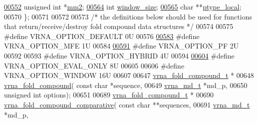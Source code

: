 \begin{DoxyCode}
\hypertarget{data__structures_8h_source_l00552}{}\hyperlink{group__fold__compound_a54c0b979274b285a7e093ed54aa3252e}{00552}   \textcolor{keywordtype}{unsigned} \textcolor{keywordtype}{int}    *\hyperlink{group__fold__compound_a54c0b979274b285a7e093ed54aa3252e}{mm2};           
\hypertarget{data__structures_8h_source_l00564}{}\hyperlink{group__fold__compound_adacbf7cdfb47d3072683ab509de735f6}{00564}   \textcolor{keywordtype}{int}             \hyperlink{group__fold__compound_adacbf7cdfb47d3072683ab509de735f6}{window\_size};    
\hypertarget{data__structures_8h_source_l00565}{}\hyperlink{group__fold__compound_a2ecb8ff5e21190936a8a146be7a251ff}{00565}   \textcolor{keywordtype}{char}            **\hyperlink{group__fold__compound_a2ecb8ff5e21190936a8a146be7a251ff}{ptype\_local};  
00570 \};
00571 
00572 
00573 \textcolor{comment}{/* the definitions below should be used for functions that return/receive/destroy fold compound data
       structures */}
00574 
00575 \textcolor{preprocessor}{#define VRNA\_OPTION\_DEFAULT         0U}
00576 
\hypertarget{data__structures_8h_source_l00583}{}\hyperlink{group__fold__compound_gae63be9127fe7dcc1f9bb14f5bb1064ee}{00583} \textcolor{preprocessor}{#define VRNA\_OPTION\_MFE             1U}
00584 
\hypertarget{data__structures_8h_source_l00591}{}\hyperlink{group__fold__compound_gabfbadcddda3e74ce7f49035ef8f058f7}{00591} \textcolor{preprocessor}{#define VRNA\_OPTION\_PF              2U}
00592 
00593 \textcolor{preprocessor}{#define VRNA\_OPTION\_HYBRID          4U}
00594 
\hypertarget{data__structures_8h_source_l00604}{}\hyperlink{group__fold__compound_ga61469c423131552c8483229f8b6c7e0e}{00604} \textcolor{preprocessor}{#define VRNA\_OPTION\_EVAL\_ONLY       8U}
00605 
00606 \textcolor{preprocessor}{#define VRNA\_OPTION\_WINDOW          16U}
00607 
00647 \hyperlink{group__fold__compound_structvrna__fc__s}{vrna\_fold\_compound\_t} *
00648 \hyperlink{group__fold__compound_ga6601d994ba32b11511b36f68b08403be}{vrna\_fold\_compound}( \textcolor{keyword}{const} \textcolor{keywordtype}{char} *sequence,
00649                     \hyperlink{group__model__details_structvrna__md__s}{vrna\_md\_t} *md\_p,
00650                     \textcolor{keywordtype}{unsigned} \textcolor{keywordtype}{int} options);
00651 
00689 \hyperlink{group__fold__compound_structvrna__fc__s}{vrna\_fold\_compound\_t} *
00690 \hyperlink{group__fold__compound_gad6bacc816af274922b13d947f708aa0c}{vrna\_fold\_compound\_comparative}( \textcolor{keyword}{const} \textcolor{keywordtype}{char} **sequences,
00691                                 \hyperlink{group__model__details_structvrna__md__s}{vrna\_md\_t} *md\_p,

\end{DoxyCode}
